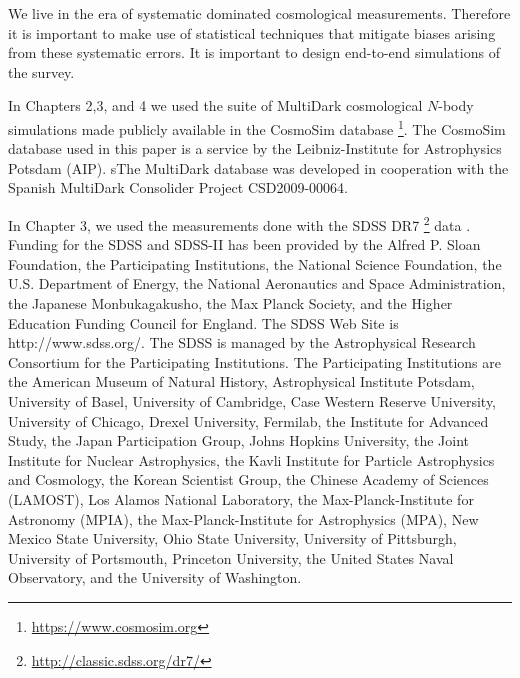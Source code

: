 We live in the era of systematic dominated cosmological measurements. 
Therefore it is important to make use of statistical techniques that mitigate 
biases arising from these systematic errors. It is important to design end-to-end simulations of the survey.


In Chapters 2,3, and 4 we used the suite of MultiDark cosmological $N$-body simulations made publicly available in the CosmoSim database \footnote{\url{https://www.cosmosim.org}}. The CosmoSim database used in this paper is a service by the Leibniz-Institute for Astrophysics Potsdam (AIP). sThe MultiDark database was developed in cooperation with the Spanish MultiDark Consolider Project CSD2009-00064.

In Chapter 3, we used the measurements done with the SDSS DR7 \footnote{\url{http://classic.sdss.org/dr7/}} data \citep{abazajian2009}. 
Funding for the SDSS and SDSS-II has been provided by the Alfred P. Sloan Foundation, the Participating Institutions, the National Science Foundation, the U.S. Department of Energy, the National Aeronautics and Space Administration, the Japanese Monbukagakusho, the Max Planck Society, and the Higher Education Funding Council for England. The SDSS Web Site is http://www.sdss.org/. The SDSS is managed by the Astrophysical Research Consortium for the Participating Institutions. The Participating Institutions are the American Museum of Natural History, Astrophysical Institute Potsdam, University of Basel, University of Cambridge, Case Western Reserve University, University of Chicago, Drexel University, Fermilab, the Institute for Advanced Study, the Japan Participation Group, Johns Hopkins University, the Joint Institute for Nuclear Astrophysics, the Kavli Institute for Particle Astrophysics and Cosmology, the Korean Scientist Group, the Chinese Academy of Sciences (LAMOST), Los Alamos National Laboratory, the Max-Planck-Institute for Astronomy (MPIA), the Max-Planck-Institute for Astrophysics (MPA), New Mexico State University, Ohio State University, University of Pittsburgh, University of Portsmouth, Princeton University, the United States Naval Observatory, and the University of Washington.

